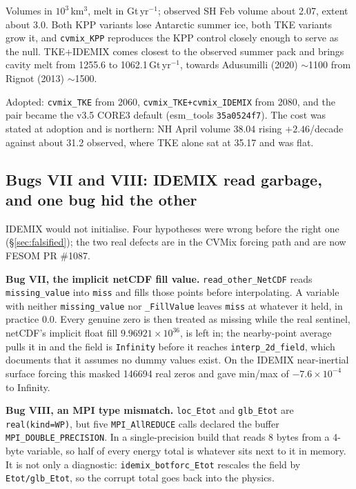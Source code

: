\documentclass[10pt]{article}
\begin{document}
Volumes in $10^3$\,km$^3$, melt in Gt\,yr$^{-1}$; observed SH Feb volume about 2.07, extent
about 3.0. Both KPP variants lose Antarctic summer ice, both TKE variants grow it, and
\texttt{cvmix\_KPP} reproduces the KPP control closely enough to serve as the null. TKE+IDEMIX
comes closest to the observed summer pack and brings cavity melt from 1255.6 to
1062.1\,Gt\,yr$^{-1}$, towards Adusumilli (2020) $\sim$1100 from Rignot (2013) $\sim$1500.

Adopted: \texttt{cvmix\_TKE} from 2060, \texttt{cvmix\_TKE+cvmix\_IDEMIX} from 2080, and the
pair became the v3.5 CORE3 default (esm\_tools \texttt{35a0524f7}). The cost was stated at
adoption and is northern: NH April volume 38.04 rising $+2.46$/decade against about 31.2
observed, where TKE alone sat at 35.17 and was flat.

\subsection{Bugs VII and VIII: IDEMIX read garbage, and one bug hid the other}\label{sub:r39idemix}

IDEMIX would not initialise. Four hypotheses were wrong before the right one
(\S\ref{sec:falsified}); the two real defects are in the CVMix forcing path and are now FESOM
PR \#1087.

\textbf{Bug VII, the implicit netCDF fill value.} \texttt{read\_other\_NetCDF} reads
\texttt{missing\_value} into \texttt{miss} and fills those points before interpolating. A
variable with neither \texttt{missing\_value} nor \texttt{\_FillValue} leaves \texttt{miss} at
whatever it held, in practice 0.0. Every genuine zero is then treated as missing while the real
sentinel, netCDF's implicit float fill $9.96921\times10^{36}$, is left in; the nearby-point
average pulls it in and the field is \texttt{Infinity} before it reaches
\texttt{interp\_2d\_field}, which documents that it assumes no dummy values exist. On the IDEMIX
near-inertial surface forcing this masked 146694 real zeros and gave min/max of
$-7.6\times10^{-4}$ to Infinity.

\textbf{Bug VIII, an MPI type mismatch.} \texttt{loc\_Etot} and \texttt{glb\_Etot} are
\texttt{real(kind=WP)}, but five \texttt{MPI\_AllREDUCE} calls declared the buffer
\texttt{MPI\_DOUBLE\_PRECISION}. In a single-precision build that reads 8 bytes from a 4-byte
variable, so half of every energy total is whatever sits next to it in memory. It is not only a
diagnostic: \texttt{idemix\_botforc\_Etot} rescales the field by \texttt{Etot/glb\_Etot}, so the
corrupt total goes back into the physics.
\end{document}
